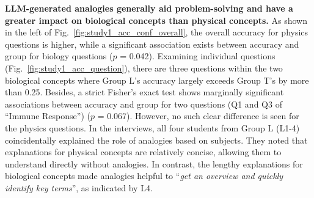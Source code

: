 \textbf{LLM-generated analogies generally aid problem-solving and have a greater impact on biological concepts than physical concepts.}
As shown in the left of Fig.~\ref{fig:study1_acc_conf_overall}, the overall accuracy for physics questions is higher, while a significant association exists between accuracy and group for biology questions ($p$ = 0.042).
Examining individual questions (Fig.~\ref{fig:study1_acc_question}), there are three questions within the two biological concepts where Group L's accuracy largely exceeds Group T's by more than 0.25.
Besides, a strict Fisher’s exact test shows marginally significant associations between accuracy and group for two questions (Q1 and Q3 of “Immune Response”) ($p$ = 0.067).
However, no such clear difference is seen for the physics questions.
In the interviews, all four students from Group L (L1-4) coincidentally explained the role of analogies based on subjects.
They noted that explanations for physical concepts are relatively concise, allowing them to understand directly without analogies. 
In contrast, the lengthy explanations for biological concepts made analogies helpful to ``\textit{get an overview and quickly identify key terms}'', as indicated by L4.


